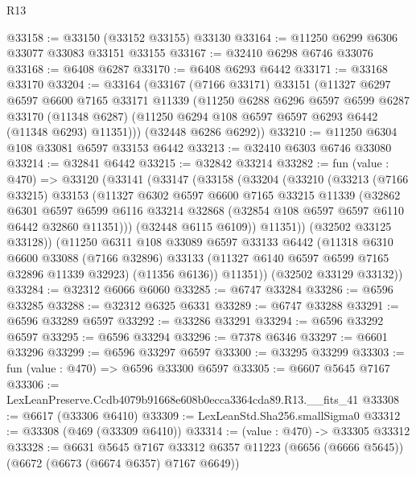 \begin{lexlean}{R13}
\begin{coremodule}
@33158 := @33150 (@33152 @33155) @33130
@33164 := @11250 @6299 @6306 @33077 @33083 @33151 @33155
@33167 := @32410 @6298 @6746 @33076
@33168 := @6408 @6287
@33170 := @6408 @6293 @6442
@33171 := @33168 @33170
@33204 := @33164
    (@33167
      (@7166 @33171)
      @33151
      (@11327
        @6297
        @6597
        @6600
        @7165
        @33171
        @11339
        (@11250
          @6288
          @6296
          @6597
          @6599
          @6287
          @33170
          (@11348 @6287)
          (@11250 @6294 @108 @6597 @6597 @6293 @6442 (@11348 @6293) @11351)))
      (@32448 @6286 @6292))
@33210 := @11250 @6304 @108 @33081 @6597 @33153 @6442
@33213 := @32410 @6303 @6746 @33080
@33214 := @32841 @6442
@33215 := @32842 @33214
@33282 := fun (value : @470) =>
  @33120
    (@33141
      (@33147
        (@33158
          (@33204
            (@33210
              (@33213
                (@7166 @33215)
                @33153
                (@11327
                  @6302
                  @6597
                  @6600
                  @7165
                  @33215
                  @11339
                  (@32862
                    @6301
                    @6597
                    @6599
                    @6116
                    @33214
                    @32868
                    (@32854 @108 @6597 @6597 @6110 @6442 @32860 @11351)))
                (@32448 @6115 @6109))
              @11351))
          (@32502 @33125 @33128))
        (@11250
          @6311
          @108
          @33089
          @6597
          @33133
          @6442
          (@11318
            @6310
            @6600
            @33088
            (@7166 @32896)
            @33133
            (@11327 @6140 @6597 @6599 @7165 @32896 @11339 @32923)
            (@11356 @6136))
          @11351))
      (@32502 @33129 @33132))
@33284 := @32312 @6066 @6060
@33285 := @6747 @33284
@33286 := @6596 @33285
@33288 := @32312 @6325 @6331
@33289 := @6747 @33288
@33291 := @6596 @33289 @6597
@33292 := @33286 @33291
@33294 := @6596 @33292 @6597
@33295 := @6596 @33294
@33296 := @7378 @6346
@33297 := @6601 @33296
@33299 := @6596 @33297 @6597
@33300 := @33295 @33299
@33303 := fun (value : @470) => @6596 @33300 @6597
@33305 := @6607 @5645 @7167
@33306 := LexLeanPreserve.Ccdb4079b91668e608b0ecca3364cda89.R13.__fits_41
@33308 := @6617 (@33306 @6410)
@33309 := LexLeanStd.Sha256.smallSigma0
@33312 := @33308 (@469 (@33309 @6410))
@33314 := (value : @470) -> @33305 @33312
@33328 := @6631
    @5645
    @7167
    @33312
    @6357
    @11223
    (@6656 (@6666 @5645))
    (@6672 (@6673 (@6674 @6357) @7167 @6649))

\end{coremodule}
\end{lexlean}
